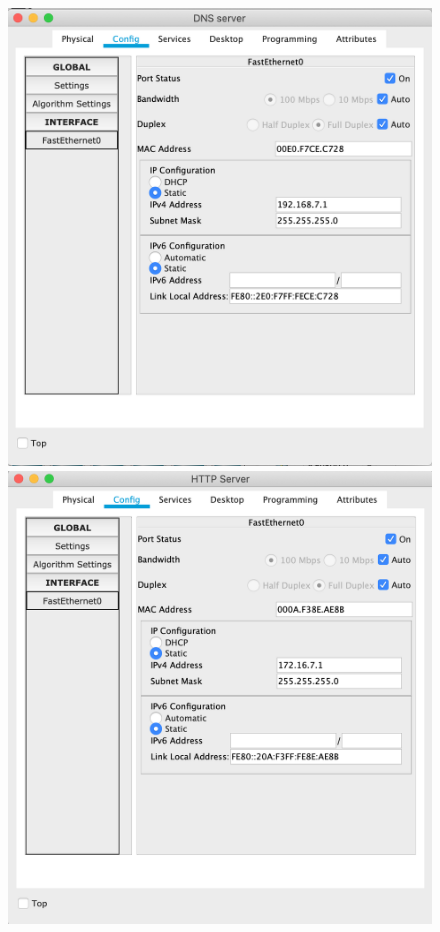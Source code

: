 \documentclass[a4paper,12pt]{article}
\begin{document}
	\begin{figure}[h!]
		\begin{minipage}[b]{0.32\textwidth}
			\includegraphics[width=\textwidth]{2.1.png}
		\end{minipage}
		\begin{minipage}[b]{0.32\textwidth}
			\includegraphics[width=\textwidth]{2.2.png}

\end{minipage}
\end{figure}
\end{document}
